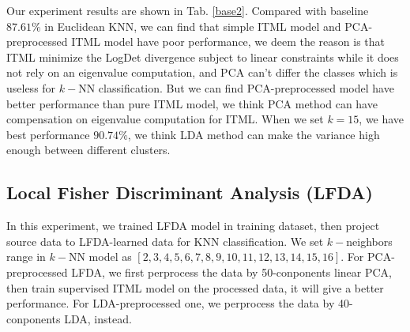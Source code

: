\documentclass[conference]{IEEEtran}
\begin{document}
Our experiment results are shown in Tab. \ref{base2}. Compared with baseline $87.61\%$ in Euclidean KNN, we can find that simple ITML model and PCA-preprocessed ITML model have poor performance, we deem the reason is that ITML minimize the LogDet divergence subject to linear constraints while it does not rely on an eigenvalue computation, and PCA can't differ the classes which is useless for $k-$NN classification. But we can find PCA-preprocessed model have better performance than pure ITML model, we think PCA method can have compensation on eigenvalue computation for ITML. When we set $k=15$, we have best performance $90.74\%$, we think LDA method can make the variance high enough between different clusters. 


\subsection{Local Fisher Discriminant Analysis (LFDA)}


In this experiment, we trained LFDA model in training dataset, then project source data to LFDA-learned data for KNN classification. We set $k-$neighbors range in $k-$NN model as $[2, 3, 4, 5, 6, 7, 8, 9, 10, 11, 12, 13, 14, 15, 16]$. For PCA-preprocessed LFDA, we first perprocess the data by 50-conponents linear PCA, then train supervised ITML model on the processed data, it will give a better performance. For LDA-preprocessed one, we perprocess the data by 40-conponents LDA, instead.
\end{document}
